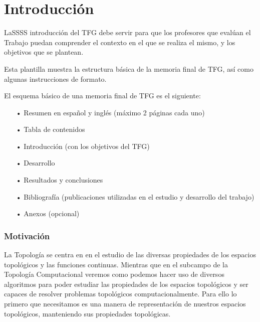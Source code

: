 \chapter{Introducción}
LaSSSS introducción del TFG debe servir para que los profesores que evalúan el Trabajo puedan comprender el contexto en el que se realiza el mismo, y los objetivos que se plantean.

Esta plantilla muestra la estructura básica de la memoria final de TFG, así como algunas instrucciones de formato.

El esquema básico de una memoria final de TFG es el siguiente:
\begin{itemize}
\item[•] Resumen en español y inglés (máximo 2 páginas cada uno)
\item[•] Tabla de contenidos
\item[•] Introducción (con los objetivos del TFG)
\item[•] Desarrollo
\item[•] Resultados y conclusiones
\item[•] Bibliografía (publicaciones utilizadas en el estudio y desarrollo del trabajo)
\item[•] Anexos (opcional)
\end{itemize}


\subsection{Motivación}
La Topología se centra en en el estudio de las diversas propiedades de los espacios topológicos y las funciones continuas. Mientras que en el subcampo de la Topología Computacional veremos como podemos hacer uso de diversos algoritmos para poder estudiar las propiedades de los espacios topológicos y ser capaces de resolver problemas topológicos computacionalmente. Para ello lo primero que necesitamos es una manera de representación de nuestros espacios topológicos, manteniendo sus propiedades topológicas.